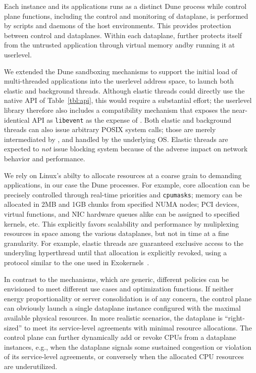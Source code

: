Each \ix instance and its applications runs as a distinct Dune process
while control plane functions, including the control and monitoring of
dataplane, is performed by scripts and daemons of the host
environments.  This provides protection between control and
dataplanes. Within each dataplane, \ix further protects itself from
the untrusted application through virtual memory andby running it at
userlevel.

 We extended the Dune
sandboxing mechanisms to support the initial load of multi-threaded
applications into the userlevel address space, to launch both elastic
and background threads.  Although elastic threads could directly use
the native API of Table~\ref{tbl:api}, this would require a
substantial effort; the userlevel library therefore also includes a
compatibility mechanism that exposes the near-identical API as
\texttt{libevent} as the expense of .  Both
elastic and background threads can also issue arbitrary POSIX system
calls; those are merely intermediated by \ix, and handled by the
underlying OS.  Elastic threads are expected to \emph{not} issue blocking
system because of the adverse impact on network behavior and
performance.

We rely on Linux's abilty to allocate resources at a coarse grain to
demanding applications, in our case the Dune processes.  For example,
core allocation can be precisely controlled through real-time
priorities and \texttt{cpumasks}; memory can be allocated in 2MB and
1GB chunks from specified NUMA nodes; PCI devices, virtual functions,
and NIC hardware queues alike can be assigned to specified \ix
kernels, etc.  This explicitly favors scalability and performance by
muliplexing resources in space among the various dataplanes, but not
in time at a fine granularity.  For example, elastic threads are
guaranteed exclusive access to the underyling hyperthread until that
allocation is explicitly revoked, using a protocol similar to the one
used in Exokernels~\cite{DBLP:conf/sosp/EnglerKO95}.  

In contrast to the mechanisms, which are generic, different policies
can be envisioned to meet different use cases and optimization
functions.  If neither energy proportionality or server consolidation
is of any concern, the control plane can obviously launch a single
dataplane instance configured with the maximal available physical
resources.  In more realistic scenarios, the dataplane is
``right-sized'' to meet its service-level agreements with minimal
resource allocations.  The control plane can further dynamically add
or revoke CPUs from a dataplane instances, e.g., when the dataplane
signals some sustained congestion or violation of its service-level
agreements, or conversely when the allocated CPU resources are
underutilized.

